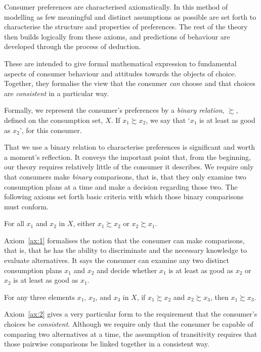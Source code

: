 \documentclass[b5paper]{memoir}
\begin{document}
Consumer preferences are characterised axiomatically. In this method of modelling as few
meaningful and distinct assumptions as possible are set forth to characterise the
structure and properties of preferences. The rest of the theory then builds logically from
these axioms, and predictions of behaviour are developed through the process of deduction.

These  are intended to give formal mathematical
expression to fundamental aspects of consumer behaviour and attitudes towards the objects
of choice. Together, they formalise the view that the consumer \emph{can} choose and that
choices are \emph{consistent} in a particular way.

Formally, we represent the consumer’s preferences by a \emph{binary relation}, $\succsim$,
defined on the consumption set, $X$. If $x_1 \succsim x_2$, we say that ‘$x_1$ is at least
as good as $x_2$’, for this consumer.

That we use a binary relation to characterise preferences is significant and worth a
moment’s reflection. It conveys the important point that, from the beginning, our theory
requires relatively little of the consumer it describes. We require only that consumers
make \emph{binary} comparisons, that is, that they only examine two consumption plans at a
time and make a decision regarding those two. The following axioms set forth basic
criteria with which those binary comparisons must conform.

\begin{axiom}[Completeness] \label{ax:1}
For all $x_1$ and $x_2$ in $X$, either $x_1 \succsim x_2$ or $x_2 \succsim x_1$.
\end{axiom}

Axiom~\ref{ax:1} formalises the notion that the consumer can make comparisons, that is,
that he has the ability to discriminate and the necessary knowledge to evaluate
alternatives. It says the consumer can examine any two distinct consumption plans $x_1$
and $x_2$ and decide whether $x_1$ is at least as good as $x_2$ or $x_2$ is at least as
good as $x_1$.

\begin{axiom}[Transitivity] \label{ax:2}
For any three elements $x_1$, $x_2$, and $x_3$ in $X$, if $x_1 \succsim x_2$ and $x_2
\succsim x_3$, then $x_1 \succsim x_3$.
\end{axiom}

Axiom~\ref{ax:2} gives a very particular form to the requirement that the consumer’s
choices be \emph{consistent}. Although we require only that the consumer be capable of
comparing two alternatives at a time, the assumption of transitivity requires that those
pairwise comparisons be linked together in a consistent way.
\end{document}

